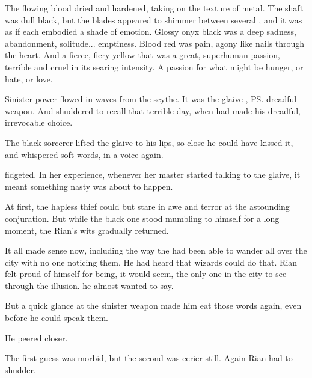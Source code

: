 \begin{prose}
  The flowing blood dried and hardened, taking on the texture of metal. 
  The shaft was dull black, but the blades appeared to shimmer between several \colours, and it was as if each \colour embodied a shade of emotion. 
  Glossy onyx black was a deep sadness, abandonment, solitude... emptiness. 
  Blood red was pain, agony like nails through the heart. 
  And a fierce, fiery yellow that was a great, superhuman passion, terrible and cruel in its searing intensity. 
  A passion for what might be hunger, or hate, or love. 
  
  Sinister power flowed in waves from the scythe. 
  It was the glaive \AeocrithRystessakhin, \ps{\Ishnaruchaefir}{} dreadful weapon. 
  And \Criseis{} shuddered to recall that terrible day, when \QuessanthIshnaruchaefir{} had made his dreadful, irrevocable choice. 
  
  The black sorcerer lifted the glaive to his lips, so close he could have kissed it, and whispered soft words, in a \scathaese{} voice again. 
  
  \Criseis{} fidgeted. 
  In her experience, whenever her master started talking to the glaive, it meant something nasty was about to happen. 
  
  
  
  \new
  At first, the hapless thief could but stare in awe and terror at the astounding conjuration. But while the black one stood mumbling to himself for a long moment, the Rian's wits gradually returned. 
  
  
  It all made sense now, including the way the \scathae{} had been able to wander all over the city with no one noticing them. He had heard that wizards could do that. 
  Rian felt proud of himself for being, it would seem, the only one in the city to see through the illusion. 
   he almost wanted to say. 
  
  But a quick glance at the sinister weapon made him eat those words again, even before he could speak them. 
  
  He peered closer. 
  
  The first guess was morbid, but the second was eerier still. Again Rian had to shudder. 
\end{prose}
